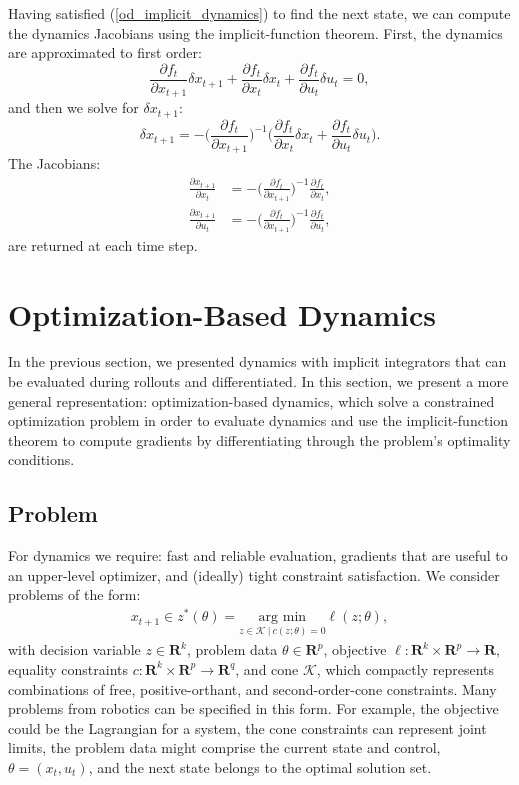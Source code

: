 Having satisfied (\ref{od_implicit_dynamics}) to find the next state, we can compute the dynamics Jacobians using the implicit-function theorem. First, the dynamics are approximated to first order:
\begin{equation}
	\frac{\partial f_t}{\partial x_{t+1}} \delta x_{t+1} + \frac{\partial f_t}{\partial x_t} \delta x_t + \frac{\partial f_t}{\partial u_t} \delta u_t  = 0,
\end{equation}
and then we solve for $\delta x_{t+1}$:
\begin{equation}
	\delta x_{t+1} = -\Big(\frac{\partial f_t}{\partial x_{t+1}}\Big)^{-1} \Big(\frac{\partial f_t}{\partial x_t} \delta x_t
	+ \frac{\partial f_t}{\partial u_t} \delta u_t \Big).
\end{equation}
The Jacobians:
\begin{align}
	\frac{\partial x_{t+1}}{\partial x_t} &= -\Big(\frac{\partial f_t}{\partial x_{t+1}}\Big)^{-1} \frac{\partial f_t}{\partial x_t}, \\
	\frac{\partial x_{t+1}}{\partial u_t} &= -\Big(\frac{\partial f_t}{\partial x_{t+1}}\Big)^{-1} \frac{\partial f_t}{\partial u_t}, \label{od_implicit_integrator_jacobians}
\end{align}
are returned at each time step.

\section{Optimization-Based Dynamics} \label{od}
In the previous section, we presented dynamics with implicit integrators that can be evaluated during rollouts and differentiated. In this section, we present a more general representation: optimization-based dynamics, which solve a constrained optimization problem in order to evaluate dynamics and use the implicit-function theorem to compute gradients by differentiating through the problem's optimality conditions.

\subsection{Problem}
For dynamics we require: fast and reliable evaluation, gradients that are useful to an upper-level optimizer, and (ideally) tight constraint satisfaction. We consider problems of the form:
\begin{align}
	x_{t+1} \in z^*(\theta) = \underset{z \in \mathcal{K} \:| \: c(z; \theta) = 0 }{\mbox{arg min}} \ell(z; \theta),
	\label{od_argmin}
\end{align}
with decision variable $z \in \mathbf{R}^k$, problem data $\theta \in \mathbf{R}^p$, objective $\ell : \mathbf{R}^k \times \mathbf{R}^p \rightarrow \mathbf{R}$, equality constraints $c : \mathbf{R}^k \times \mathbf{R}^p \rightarrow \mathbf{R}^q$, and cone $\mathcal{K}$, which compactly represents combinations of free, positive-orthant, and second-order-cone constraints. Many problems from robotics can be specified in this form. For example, the objective could be the Lagrangian for a system, the cone constraints can represent joint limits, the problem data might comprise the current state and control, $\theta = (x_t, u_t)$, and the next state belongs to the optimal solution set. 

